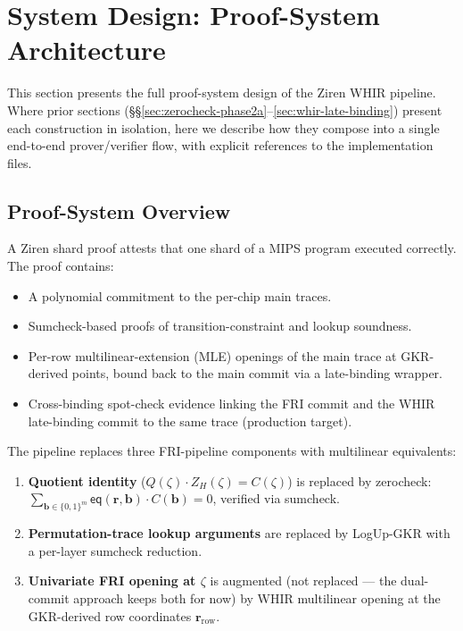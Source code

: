 \section{System Design: Proof-System Architecture}
\label{sec:design}

This section presents the full proof-system design of the Ziren WHIR
pipeline.  Where prior sections (\S\S\ref{sec:zerocheck-phase2a}--\ref{sec:whir-late-binding})
present each construction in isolation, here we describe how they
compose into a single end-to-end prover/verifier flow, with explicit
references to the implementation files.

\subsection{Proof-System Overview}

A Ziren shard proof attests that one shard of a MIPS program
executed correctly.  The proof contains:
\begin{itemize}
  \item A polynomial commitment to the per-chip main traces.
  \item Sumcheck-based proofs of transition-constraint and lookup
        soundness.
  \item Per-row multilinear-extension (MLE) openings of the main
        trace at GKR-derived points, bound back to the main commit
        via a late-binding wrapper.
  \item Cross-binding spot-check evidence linking the FRI commit
        and the WHIR late-binding commit to the same trace
        (production target).
\end{itemize}

The pipeline replaces three FRI-pipeline components with multilinear
equivalents:
\begin{enumerate}
  \item \textbf{Quotient identity} ($Q(\zeta) \cdot Z_H(\zeta) =
        C(\zeta)$) is replaced by zerocheck:
        $\sum_{\mathbf{b} \in \{0,1\}^m} \mathsf{eq}(\mathbf{r},
        \mathbf{b}) \cdot C(\mathbf{b}) = 0$, verified via sumcheck.
  \item \textbf{Permutation-trace lookup arguments} are replaced by
        LogUp-GKR with a per-layer sumcheck reduction.
  \item \textbf{Univariate FRI opening at $\zeta$} is augmented (not
        replaced --- the dual-commit approach keeps both for now)
        by WHIR multilinear opening at the GKR-derived row coordinates
        $\mathbf{r}_{\mathrm{row}}$.
\end{enumerate}


